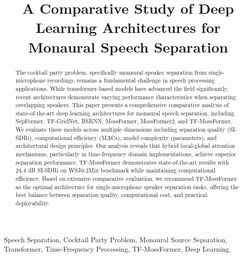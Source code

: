 \documentclass[conference]{IEEEtran}
\begin{document}
\title{A Comparative Study of Deep Learning Architectures for Monaural Speech Separation}

\author{


}

\maketitle

\begin{abstract} 
The cocktail party problem, specifically monaural speaker separation from single-microphone recordings, remains a fundamental challenge in speech processing applications. While transformer-based models have advanced the field significantly, recent architectures demonstrate varying performance characteristics when separating overlapping speakers. This paper presents a comprehensive comparative analysis of state-of-the-art deep learning architectures for monaural speech separation, including SepFormer, TF-GridNet, BSRNN, MossFormer, MossFormer2, and TF-MossFormer. We evaluate these models across multiple dimensions including separation quality (SI-SDRi), computational efficiency (MACs), model complexity (parameters), and architectural design principles. Our analysis reveals that hybrid local-global attention mechanisms, particularly in time-frequency domain implementations, achieve superior separation performance. TF-MossFormer demonstrates state-of-the-art results with 24.4 dB SI-SDRi on WSJ0-2Mix benchmark while maintaining computational efficiency. Based on extensive comparative evaluation, we recommend TF-MossFormer as the optimal architecture for single-microphone speaker separation tasks, offering the best balance between separation quality, computational cost, and practical deployability.
\end{abstract}

\begin{IEEEkeywords}
Speech Separation, Cocktail Party Problem, Monaural Source Separation, Transformer, Time-Frequency Processing, TF-MossFormer, Deep Learning.
\end{IEEEkeywords}
\end{document}
